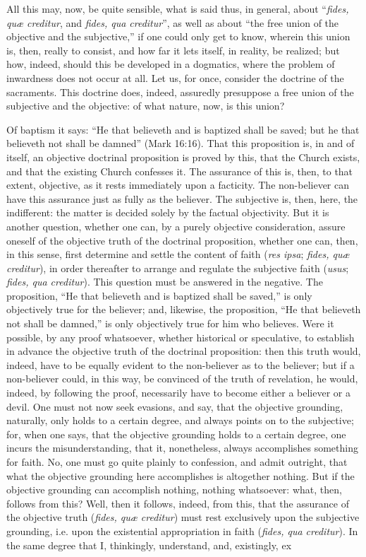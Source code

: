 \documentclass[12pt]{book}
\begin{document}
All this may, now, be quite sensible, what is said thus, in general, about ``\textit{fides, quæ creditur}, and \textit{fides, qua creditur}'', as well as about ``the free union of the objective and the subjective,'' if one could only get to know, wherein this union is, then, really to consist, and how far it lets itself, in reality, be realized; but how, indeed, should this be developed in a dogmatics, where the problem of inwardness does not occur at all. Let us, for once, consider the doctrine of the sacraments. This doctrine does, indeed, assuredly presuppose a free union of the subjective and the objective: of what nature, now, is this union?

Of baptism it says: ``He that believeth and is baptized shall be saved; but he that believeth not shall be damned'' (Mark 16:16). That this proposition is, in and of itself, an objective doctrinal proposition is proved by this, that the Church exists, and that the existing Church confesses it. The assurance of this is, then, to that extent, objective, as it rests immediately upon a facticity. The non-believer can have this assurance just as fully as the believer. The subjective is, then, here, the indifferent: the matter is decided solely by the factual objectivity. But it is another question, whether one can, by a purely objective consideration, assure oneself of the objective truth of the doctrinal proposition, whether one can, then, in this sense, first determine and settle the content of faith (\textit{res ipsa}; \textit{fides, quæ creditur}), in order thereafter to arrange and regulate the subjective
faith (\textit{usus}; \textit{fides, qua creditur}). This question must be answered in the negative. The proposition, ``He that believeth and is baptized shall be saved,'' is only objectively true for the believer; and, likewise, the proposition, ``He that believeth not shall be damned,'' is only objectively true for him who believes. Were it possible, by any proof whatsoever, whether historical or speculative, to establish in advance the objective truth of the doctrinal proposition: then this truth would, indeed, have to be equally evident to the non-believer as to the believer; but if a non-believer could, in this way, be convinced of the truth of revelation, he would, indeed, by following the proof, necessarily have to become either a believer or a devil. One must not now seek evasions, and say, that the objective grounding, naturally, only holds to a certain degree, and always points on to the subjective; for, when one says, that the objective grounding holds to a certain degree, one incurs the misunderstanding, that it, nonetheless, always accomplishes something for faith. No, one must go quite plainly to confession, and admit outright, that what the objective grounding here accomplishes is altogether nothing. But if the objective grounding can accomplish nothing, nothing whatsoever: what, then, follows from this? Well, then it follows, indeed, from this, that the assurance of the objective truth (\textit{fides, quæ creditur}) must rest exclusively upon the subjective grounding, i.e. upon the existential appropriation in faith (\textit{fides, qua creditur}). In the same degree that I, thinkingly, understand, and, existingly, ex\-%
\end{document}
